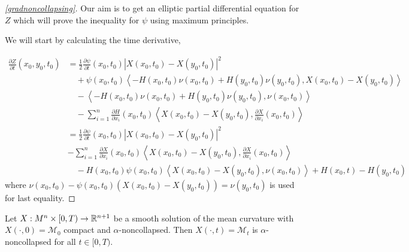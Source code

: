 \begin{proof}[\cref{gradnoncollapsing}]
    Our aim is to get an elliptic partial differential equation for $ Z $ which will prove the inequality for $ \psi $ using maximum principles. 



    We will start by calculating the time derivative,
    
    \begin{align*}
        \frac{\partial Z}{\partial t}(x_{0},y_{0},t_{0}) & = \frac{1}{2} \frac{\partial \psi}{\partial t}(x_{0},t_{0})|X(x_{0},t_{0})-X(y_{0},t_{0})|^{2} \\
        & \quad + \psi(x_{0},t_{0}) \left< -H(x_{0},t_{0})\nu(x_{0},t_{0})+H(y_{0},t_{0})\nu(y_{0},t_{0}), X(x_{0},t_{0})-X(y_{0},t_{0}) \right>  \\
        &\quad - \left< -H(x_{0},t_{0})\nu(x_{0},t_{0})+H(y_{0},t_{0})\nu(y_{0},t_{0}), \nu (x_{0},t_{0}) \right> \\
        & \quad - \sum_{i=1}^{n} \frac{\partial H}{\partial x_{i}}(x_{0},t_{0}) \left< X(x_{0},t_{0})-X(y_{0},t_{0}), \frac{\partial X}{\partial x_{i}}(x_{0},t_{0}) \right> \\
        & = \frac{1}{2} \frac{\partial \psi}{\partial t}(x_{0},t_{0})|X(x_{0},t_{0})-X(y_{0},t_{0})|^{2} \\
        \quad & - \sum_{i=1}^{n} \frac{\partial X}{\partial x_{i}}(x_{0},t_{0})\left< X(x_{0},t_{0})-X(y_{0},t_{0}), \frac{\partial X}{\partial x_{i}}(x_{0},t_{0}) \right> \\ 
        & \quad -H(x_{0},t_{0})\psi(x_{0},t_{0})\left< X(x_{0},t_{0})-X(y_{0},t_{0}), \nu(x_{0},t_{0}) \right> + H(x_{0},t)-H(y_{0},t_{0})
    \end{align*}
    where $ \nu(x_{0},t_{0}) - \psi(x_{0},t_{0})(X(x_{0},t_{0})-X(y_{0},t_{0})) =\nu(y_{0},t_{0})  $ is used for last equality. 


















\end{proof}
\begin{corollary}
    [Noncollapsing]
    Let $ X: M^{n} \times [0,T) \to \mathbb{R}^{n+1} $ be a smooth solution of the mean curvature with $ X(\cdot, 0) = \mathcal{M}_{0} $ compact and $ \alpha $-noncollapsed. Then $ X(\cdot,t) = \mathcal{M}_{t} $ is $ \alpha $-noncollapsed for all $t \in [0,T)  $. 
\end{corollary}
